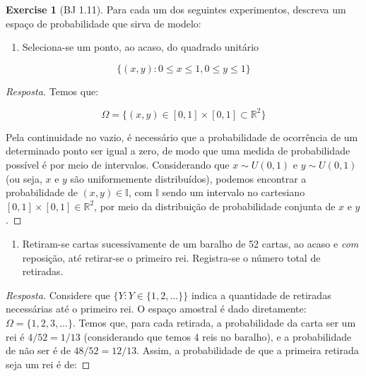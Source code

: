 \documentclass[
]{article}
\providecommand{\tightlist}{%
  \setlength{\itemsep}{0pt}\setlength{\parskip}{0pt}}
\theoremstyle{definition}
\theoremstyle{definition}
\theoremstyle{definition}
\newtheorem{exercise}{Exercise}[section]
\theoremstyle{definition}
\theoremstyle{remark}
\begin{document}
\begin{exercise}[BJ 1.11]

Para cada um dos seguintes experimentos, descreva um espaço de probabilidade que sirva de modelo:

\begin{enumerate}
\def\labelenumi{\alph{enumi})}
\tightlist
\item
  Seleciona-se um ponto, ao acaso, do quadrado unitário
\end{enumerate}

\begin{equation*}
\{(x,y) : 0 \le x \le 1, 0 \le y \le 1\}
\end{equation*}

\begin{proof}[Resposta]
Temos que:

\begin{equation*}
\Omega = \{(x,y) \in [0,1] \times [0,1] \subset \mathbb{R}^{2}\}
\end{equation*}

Pela continuidade no vazio, é necessário que a probabilidade de ocorrência de um determinado ponto ser igual a zero, de modo que uma medida de probabilidade possível é por meio de intervalos. Considerando que \(x \sim U(0,1)\) e \(y \sim U(0,1)\) (ou seja, \(x\) e \(y\) são uniformemente distribuídos), podemos encontrar a probabilidade de \((x,y) \in \mathbb{I}\), com \(\mathbb{I}\) sendo um intervalo no cartesiano \([0,1] \times [0,1] \in \mathbb{R}^{2}\), por meio da distribuição de probabilidade conjunta de \(x\) e \(y\).
\end{proof}

\begin{enumerate}
\def\labelenumi{\alph{enumi})}
\setcounter{enumi}{1}
\tightlist
\item
  Retiram-se cartas sucessivamente de um baralho de 52 cartas, ao acaso e \emph{com} reposição, até retirar-se o primeiro rei. Registra-se o número total de retiradas.
\end{enumerate}

\begin{proof}[Resposta]
Considere que \(\{Y: Y \in \{1,2,\dots\}\}\) indica a quantidade de retiradas necessárias até o primeiro rei. O espaço amostral é dado diretamente: \(\Omega = \{1,2,3,\dots\}\). Temos que, para cada retirada, a probabilidade da carta ser um rei é \(4/52 = 1/13\) (considerando que temos 4 reis no baralho), e a probabilidade de não ser é de \(48/52 = 12/13\). Assim, a probabilidade de que a primeira retirada seja um rei é de:


\end{proof}
\end{exercise}
\end{document}
